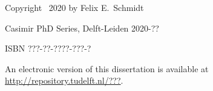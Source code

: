 \begin{titlepage}
\noindent Copyright \textcopyright\ 2020 by Felix E.~Schmidt

\noindent Casimir PhD Series, Delft-Leiden 2020-??

\medskip
\noindent ISBN ???-??-????-???-?

\medskip
\noindent An electronic version of this dissertation is available at \\
\url{http://repository.tudelft.nl/???}.

\end{titlepage}

